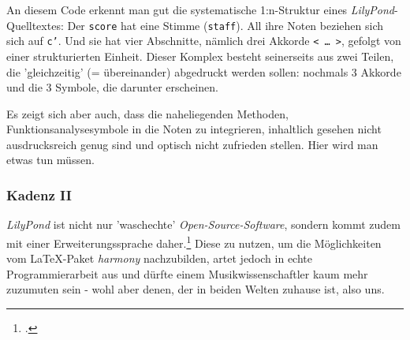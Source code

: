 An diesem Code erkennt man gut die systematische 1:n-Struktur eines
\textit{LilyPond}-Quelltextes: Der \texttt{score} hat eine Stimme
(\texttt{staff}). All ihre Noten beziehen sich sich auf \texttt{c'}. Und sie hat
vier Abschnitte, nämlich drei Akkorde \texttt{< \ldots\ >}, gefolgt von einer
strukturierten Einheit. Dieser Komplex besteht seinerseits aus zwei Teilen, die
'gleichzeitig' (= übereinander) abgedruckt werden sollen: nochmals 3 Akkorde und
die 3 Symbole, die darunter erscheinen.

Es zeigt sich aber auch, dass die naheliegenden Methoden,
Funktionsanalysesymbole in die Noten zu integrieren, inhaltlich gesehen nicht
ausdrucksreich genug sind und optisch nicht zufrieden stellen. Hier wird man
etwas tun müssen. 

\subsubsection{Kadenz II}

\textit{LilyPond} ist nicht nur 'waschechte' \textit{Open-Source-Software}, sondern
kommt zudem mit einer Erweiterungssprache daher.\footcite[vgl. dazu][\nopage
wp]{WpedGuile2019a} Diese zu nutzen, um die Möglichkeiten vom \LaTeX-Paket
\textit{harmony} nachzubilden, artet jedoch in echte Programmierarbeit aus und
dürfte einem Musikwissenschaftler kaum mehr zuzumuten sein - wohl aber denen,
der in beiden Welten zuhause ist, also uns.

